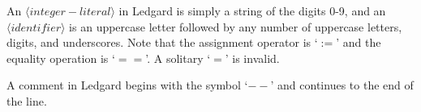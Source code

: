 \documentclass[11pt]{article}
\begin{document}
An $\langle integer-literal \rangle$ in Ledgard is simply a string of
the digits 0-9, and an $\langle identifier \rangle$ is an uppercase
letter followed by any number of uppercase letters, digits, and
underscores.  Note that the assignment operator is `$:=$' and the
equality operation is `$==$'.  A solitary `$=$' is invalid.

A comment in Ledgard begins with the symbol `$--$' and continues to
the end of the line.
\end{document}
